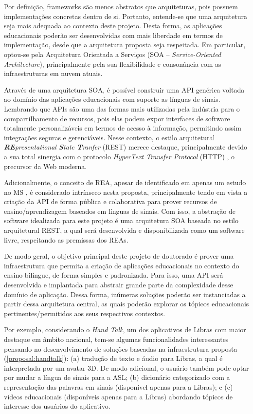 Por definição, frameworks são menos abstratos que arquiteturas, pois possuem implementações concretas dentro de si. Portanto, entende-se que uma arquitetura seja mais adequada ao contexto deste projeto. Desta forma, as aplicações educacionais poderão ser desenvolvidas com mais liberdade em termos de implementação, desde que a arquitetura proposta seja respeitada. Em particular, optou-se pela Arquitetura Orientada a Serviços (SOA -- \textit{Service-Oriented Architecture}), principalmente pela sua flexibilidade e consonância com as infraestruturas em nuvem atuais.

Através de uma arquitetura SOA, é possível construir uma API genérica voltada ao domínio das aplicações educacionais com suporte as línguas de sinais. Lembrando que APIs são uma das formas mais utilizadas pela indústria para o compartilhamento de recursos, pois elas podem expor interfaces de software totalmente personalizáveis em termos de acesso à informação, permitindo assim integrações seguras e gerenciáveis. Nesse contexto, o estilo arquitetural \textit{\textbf{RE}presentational \textbf{S}tate \textbf{T}ranfer} (REST) merece destaque, principalmente devido a sua total sinergia com o protocolo \textit{HyperText Transfer Protocol} (HTTP) \cite{Fielding2000}, o precursor da Web moderna.

Adicionalmente, o conceito de REA, apesar de identificado em apenas um estudo no MS \cite{BRA23}, é considerado intrínseco nesta proposta, principalmente tendo em vista a criação da API de forma pública e colaborativa para prover recursos de ensino/aprendizagem baseados em línguas de sinais. Com isso, a abstração de software idealizada para este projeto é uma arquitetura SOA baseada no estilo arquitetural REST, a qual será desenvolvida e disponibilizada como um software livre, respeitando as premissas dos REAs. %

De modo geral, o objetivo principal deste projeto de doutorado é prover uma infraestrutura que permita a criação de aplicações educacionais no contexto do ensino bilíngue, de forma simples e padronizada. Para isso, uma API será desenvolvida e implantada para abstrair grande parte da complexidade desse domínio de aplicação. Dessa forma, inúmeras soluções poderão ser instanciadas a partir dessa arquitetura central, as quais poderão explorar os tópicos educacionais pertinentes/permitidos aos seus respectivos contextos.

Por exemplo, considerando o \textit{Hand Talk}, um dos aplicativos de Libras com maior destaque em âmbito nacional, tem-se algumas funcionalidades interessantes pensando no desenvolvimento de soluções baseadas na infraestrutura proposta (\autoref{proposal:handtalk}): (a) tradução de texto e áudio para Libras, a qual é interpretada por um avatar 3D. De modo adicional, o usuário também pode optar por mudar a língua de sinais para a ASL; (b) dicionário categorizado com a representação das palavras em sinais (disponível apenas para a Libras); e (c) vídeos educacionais  (disponíveis apenas para a Libras) abordando tópicos de interesse dos usuários do aplicativo.

